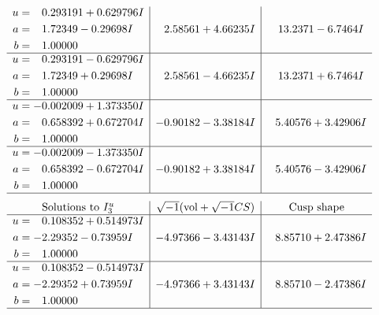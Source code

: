 \documentclass[1p]{elsarticle_modified}
\theoremstyle{definition}
\newcommand{\I}{\sqrt{-1}}
\begin{document}
$$\begin{array}{c|c|c}
\begin{aligned}
u &= \phantom{-}0.293191 + 0.629796 I \\
a &= \phantom{-}1.72349 - 0.29698 I \\
b &= \phantom{-}1.00000\phantom{ +0.000000I}\end{aligned}
 & \phantom{-}2.58561 + 4.66235 I & \phantom{-}13.2371 - 6.7464 I \\ \hline\begin{aligned}
u &= \phantom{-}0.293191 - 0.629796 I \\
a &= \phantom{-}1.72349 + 0.29698 I \\
b &= \phantom{-}1.00000\phantom{ +0.000000I}\end{aligned}
 & \phantom{-}2.58561 - 4.66235 I & \phantom{-}13.2371 + 6.7464 I \\ \hline\begin{aligned}
u &= -0.002009 + 1.373350 I \\
a &= \phantom{-}0.658392 + 0.672704 I \\
b &= \phantom{-}1.00000\phantom{ +0.000000I}\end{aligned}
 & -0.90182 - 3.38184 I & \phantom{-}5.40576 + 3.42906 I \\ \hline\begin{aligned}
u &= -0.002009 - 1.373350 I \\
a &= \phantom{-}0.658392 - 0.672704 I \\
b &= \phantom{-}1.00000\phantom{ +0.000000I}\end{aligned}
 & -0.90182 + 3.38184 I & \phantom{-}5.40576 - 3.42906 I\\
 \hline 
 \end{array}$$\newpage$$\begin{array}{c|c|c}  
\text{Solutions to }I^u_{3}& \I (\text{vol} + \sqrt{-1}CS) & \text{Cusp shape}\\
 \hline 
\begin{aligned}
u &= \phantom{-}0.108352 + 0.514973 I \\
a &= -2.29352 - 0.73959 I \\
b &= \phantom{-}1.00000\phantom{ +0.000000I}\end{aligned}
 & -4.97366 - 3.43143 I & \phantom{-}8.85710 + 2.47386 I \\ \hline\begin{aligned}
u &= \phantom{-}0.108352 - 0.514973 I \\
a &= -2.29352 + 0.73959 I \\
b &= \phantom{-}1.00000\phantom{ +0.000000I}\end{aligned}
 & -4.97366 + 3.43143 I & \phantom{-}8.85710 - 2.47386 I\\
 \hline 
 \end{array}$$\newpage\newpage\renewcommand{\arraystretch}{1}
\end{document}
